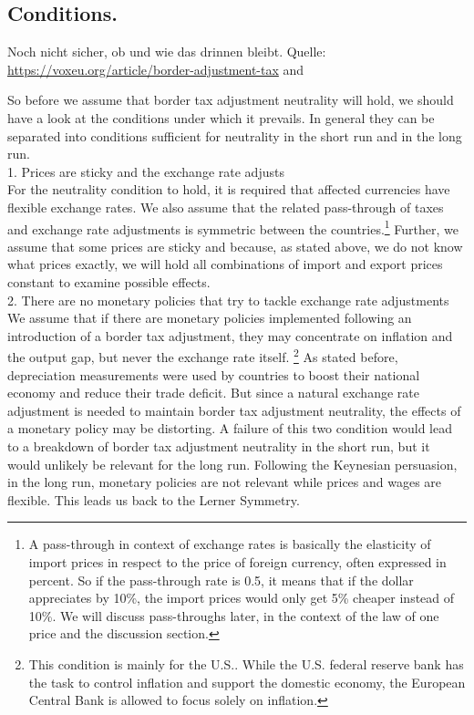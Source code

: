 
\subsection{Conditions.}

Noch nicht sicher, ob und wie das drinnen bleibt. 
Quelle: \url{https://voxeu.org/article/border-adjustment-tax} and \cite{barbiero2018macroeconomics}

So before we assume that border tax adjustment neutrality will hold, we should have a look at the conditions under which it prevails. In general they can be separated into conditions sufficient for neutrality in the short run and in the long run. \\
1. Prices are sticky and the exchange rate adjusts \\
For the neutrality condition to hold, it is required that affected currencies have flexible exchange rates. We also assume that the related pass-through of taxes and exchange rate adjustments is symmetric between the countries.\footnote{A pass-through in context of exchange rates is basically the elasticity of import prices in respect to the price of foreign currency, often expressed in percent. So if the pass-through rate is 0.5, it means that if the dollar appreciates by 10\%, the import prices would only get 5\% cheaper instead of 10\%. We will discuss pass-throughs later, in the context of the law of one price and the discussion section.} Further, we assume that some prices are sticky and because, as stated above, we do not know what prices exactly, we will hold all combinations of import and export prices constant to examine possible effects. \\
2. There are no monetary policies that try to tackle exchange rate adjustments \\
We assume that if there are monetary policies implemented following an introduction of a border tax adjustment, they may concentrate on inflation and the output gap, but never the exchange rate itself. \footnote{This condition is mainly for the U.S.. While the U.S. federal reserve bank has the task to control inflation and support the domestic economy, the European Central Bank is allowed to focus solely on inflation.} As stated before, depreciation measurements were used by countries to boost their national economy and reduce their trade deficit. But since a natural exchange rate adjustment is needed to maintain border tax adjustment neutrality, the effects of a monetary policy may be distorting.
A failure of this two condition would lead to a breakdown of border tax adjustment neutrality in the short run, but it would unlikely be relevant for the long run. Following the Keynesian persuasion, in the long run, monetary policies are not relevant while prices and wages are flexible. This leads us back to the Lerner Symmetry. \\
